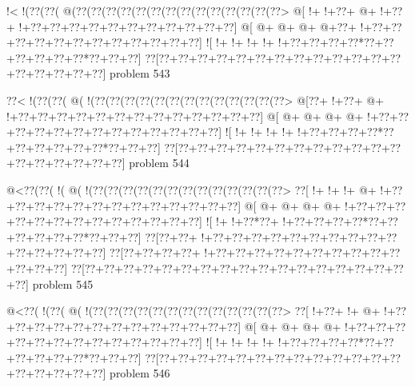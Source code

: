 \vbox{\vbox{\goo
\- !<\- !(\0??(\0??(\- @(\0??(\0??(\0??(\0??(\0??(\0??(\0??(\0??(\0??(\0??(\0??(\0??(\0??(\0??>
\- @[\- !+\- !+\0??+\- @+\- !+\0??+\- !+\0??+\0??+\0??+\0??+\0??+\0??+\0??+\0??+\0??+\0??+\0??]
\- @[\- @+\- @+\- @+\- @+\0??+\- !+\0??+\0??+\0??+\0??+\0??+\0??+\0??+\0??+\0??+\0??+\0??+\0??]
\- ![\- !+\- !+\- !+\- !+\- !+\0??+\0??+\0??+\0??*\0??+\0??+\0??+\0??+\0??+\0??*\0??+\0??+\0??]
\0??[\0??+\0??+\0??+\0??+\0??+\0??+\0??+\0??+\0??+\0??+\0??+\0??+\0??+\0??+\0??+\0??+\0??+\0??]
}
\hfil problem 543\hfil\break
}



\vbox{\vbox{\goo
\0??<\- !(\0??(\0??(\- @(\- !(\0??(\0??(\0??(\0??(\0??(\0??(\0??(\0??(\0??(\0??(\0??(\0??(\0??>
\- @[\0??+\- !+\0??+\- @+\- !+\0??+\0??+\0??+\0??+\0??+\0??+\0??+\0??+\0??+\0??+\0??+\0??+\0??]
\- @[\- @+\- @+\- @+\- @+\- !+\0??+\0??+\0??+\0??+\0??+\0??+\0??+\0??+\0??+\0??+\0??+\0??+\0??]
\- ![\- !+\- !+\- !+\- !+\- !+\0??+\0??+\0??+\0??*\0??+\0??+\0??+\0??+\0??+\0??*\0??+\0??+\0??]
\0??[\0??+\0??+\0??+\0??+\0??+\0??+\0??+\0??+\0??+\0??+\0??+\0??+\0??+\0??+\0??+\0??+\0??+\0??]
}
\hfil problem 544\hfil\break
}



\vbox{\vbox{\goo
\- @<\0??(\0??(\- !(\- @(\- !(\0??(\0??(\0??(\0??(\0??(\0??(\0??(\0??(\0??(\0??(\0??(\0??(\0??>
\0??[\- !+\- !+\- !+\- @+\- !+\0??+\0??+\0??+\0??+\0??+\0??+\0??+\0??+\0??+\0??+\0??+\0??+\0??]
\- @[\- @+\- @+\- @+\- @+\- !+\0??+\0??+\0??+\0??+\0??+\0??+\0??+\0??+\0??+\0??+\0??+\0??+\0??]
\- ![\- !+\- !+\0??*\0??+\- !+\0??+\0??+\0??+\0??*\0??+\0??+\0??+\0??+\0??+\0??*\0??+\0??+\0??]
\0??[\0??+\0??+\- !+\0??+\0??+\0??+\0??+\0??+\0??+\0??+\0??+\0??+\0??+\0??+\0??+\0??+\0??+\0??]
\0??[\0??+\0??+\0??+\0??+\- !+\0??+\0??+\0??+\0??+\0??+\0??+\0??+\0??+\0??+\0??+\0??+\0??+\0??]
\0??[\0??+\0??+\0??+\0??+\0??+\0??+\0??+\0??+\0??+\0??+\0??+\0??+\0??+\0??+\0??+\0??+\0??+\0??]
}
\hfil problem 545\hfil\break
}



\vbox{\vbox{\goo
\- @<\0??(\- !(\0??(\- @(\- !(\0??(\0??(\0??(\0??(\0??(\0??(\0??(\0??(\0??(\0??(\0??(\0??(\0??>
\0??[\- !+\0??+\- !+\- @+\- !+\0??+\0??+\0??+\0??+\0??+\0??+\0??+\0??+\0??+\0??+\0??+\0??+\0??]
\- @[\- @+\- @+\- @+\- @+\- !+\0??+\0??+\0??+\0??+\0??+\0??+\0??+\0??+\0??+\0??+\0??+\0??+\0??]
\- ![\- !+\- !+\- !+\- !+\- !+\0??+\0??+\0??+\0??*\0??+\0??+\0??+\0??+\0??+\0??*\0??+\0??+\0??]
\0??[\0??+\0??+\0??+\0??+\0??+\0??+\0??+\0??+\0??+\0??+\0??+\0??+\0??+\0??+\0??+\0??+\0??+\0??]
}
\hfil problem 546\hfil\break
}



